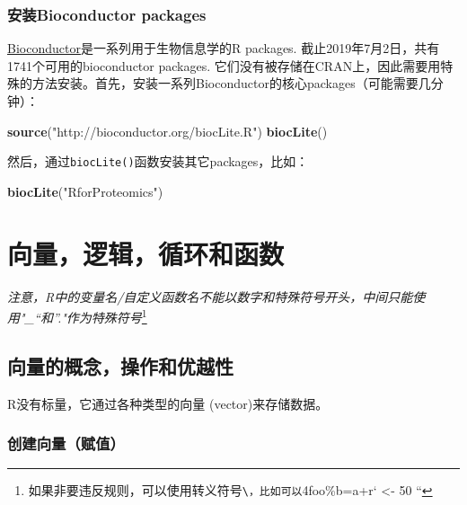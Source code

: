 \documentclass[]{book}
\newenvironment{Shaded}{\begin{snugshade}}{\end{snugshade}}
\newcommand{\KeywordTok}[1]{\textcolor[rgb]{0.13,0.29,0.53}{\textbf{#1}}}
\newcommand{\NormalTok}[1]{#1}
\newcommand{\StringTok}[1]{\textcolor[rgb]{0.31,0.60,0.02}{#1}}
\let\rmarkdownfootnote\footnote%
\def\footnote{\protect\rmarkdownfootnote}
\begin{document}
\hypertarget{Bioconductor}{%
\subsection{安装Bioconductor packages}\label{Bioconductor}}

\href{https://bioconductor.org}{Bioconductor}是一系列用于生物信息学的R packages. 截止2019年7月2日，共有1741个可用的bioconductor packages. 它们没有被存储在CRAN上，因此需要用特殊的方法安装。首先，安装一系列Bioconductor的核心packages（可能需要几分钟）：

\begin{Shaded}
\begin{Highlighting}[]
\KeywordTok{source}\NormalTok{(}\StringTok{"http://bioconductor.org/biocLite.R"}\NormalTok{)}
\KeywordTok{biocLite}\NormalTok{()}
\end{Highlighting}
\end{Shaded}

然后，通过\texttt{biocLite()}函数安装其它packages，比如：

\begin{Shaded}
\begin{Highlighting}[]
\KeywordTok{biocLite}\NormalTok{(}\StringTok{"RforProteomics"}\NormalTok{)}
\end{Highlighting}
\end{Shaded}

\hypertarget{vectors-logicals-and-functions}{%
\chapter{向量，逻辑，循环和函数}\label{vectors-logicals-and-functions}}

\emph{注意，R中的变量名/自定义函数名不能以数字和特殊符号开头，中间只能使用"\_``和''."作为特殊符号}\footnote{如果非要违反规则，可以使用转义符号\texttt{\textbackslash{}\textasciigrave{}\textasciigrave{}，比如可以\textasciigrave{}\textasciigrave{}}4foo\%b=a+r` \textless{}- 50 ``}

\section{向量的概念，操作和优越性}

R没有标量，它通过各种类型的向量 (vector)来存储数据。

\hypertarget{create-vector}{%
\subsection{创建向量（赋值）}\label{create-vector}}
\end{document}
